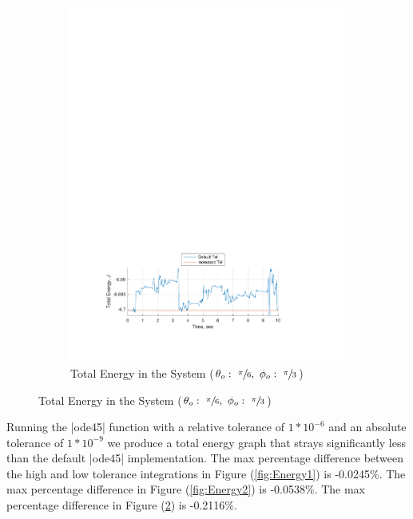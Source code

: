 \documentclass[12pt]{report}
\begin{document}
\begin{flushleft}
\begin{figure}[!ht] \ContinuedFloat
\begin{subfigure}[t]{\textwidth}
  \includegraphics[center]{Energy3}
  \caption{Total Energy in the System ($\theta_o:~\sfrac{\pi}{6},~\phi_o:~\sfrac{\pi}{3}$)}
  \label{fig:Energy3}
\end{subfigure}
\end{figure}
\newpage
\flushleft
Running the |ode45| function with a relative tolerance of
$1*10^{-6}$ and an absolute
tolerance of $1*10^{-9}$ we produce a total energy graph that strays significantly
less than the default |ode45| implementation. The max percentage difference between
the high and low tolerance integrations in Figure (\ref{fig:Energy1}) is -0.0245\%.
The max percentage difference in Figure (\ref{fig:Energy2}) is
-0.0538\%. The max percentage difference in Figure (\ref{fig:Energy3}) is
-0.2116\%.

\newpage

\end{flushleft}
\end{document}

